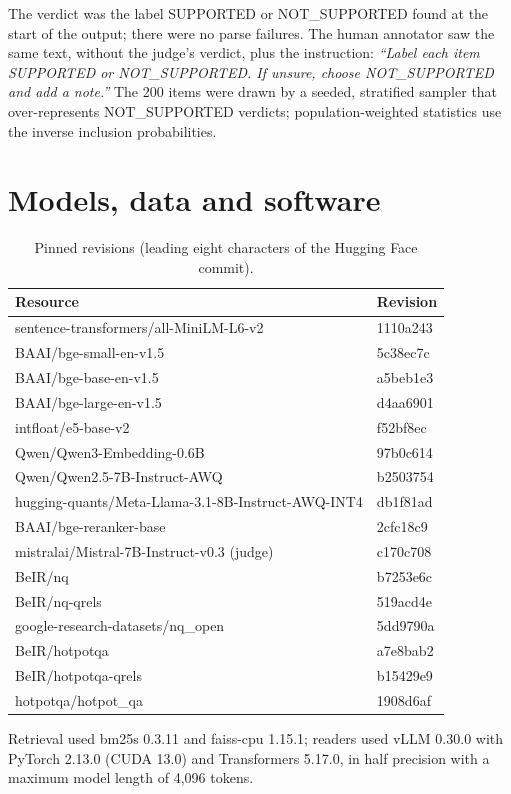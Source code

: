The verdict was the label SUPPORTED or NOT\_SUPPORTED found at the start of the output; there were no parse failures. The human annotator saw the same text, without the judge's verdict, plus the instruction: \emph{``Label each item SUPPORTED or NOT\_SUPPORTED. If unsure, choose NOT\_SUPPORTED and add a note.''} The 200 items were drawn by a seeded, stratified sampler that over-represents NOT\_SUPPORTED verdicts; population-weighted statistics use the inverse inclusion probabilities.

\section{Models, data and software}\label{app:repro}
\begin{table}[h]
\centering
\small
\caption{Pinned revisions (leading eight characters of the Hugging Face commit).}
\label{tab:revisions}
\begin{tabular}{ll}
\toprule
Resource & Revision \\
\midrule
sentence-transformers/all-MiniLM-L6-v2 & 1110a243 \\
BAAI/bge-small-en-v1.5 & 5c38ec7c \\
BAAI/bge-base-en-v1.5 & a5beb1e3 \\
BAAI/bge-large-en-v1.5 & d4aa6901 \\
intfloat/e5-base-v2 & f52bf8ec \\
Qwen/Qwen3-Embedding-0.6B & 97b0c614 \\
Qwen/Qwen2.5-7B-Instruct-AWQ & b2503754 \\
hugging-quants/Meta-Llama-3.1-8B-Instruct-AWQ-INT4 & db1f81ad \\
BAAI/bge-reranker-base & 2cfc18c9 \\
mistralai/Mistral-7B-Instruct-v0.3 (judge) & c170c708 \\
BeIR/nq & b7253e6c \\
BeIR/nq-qrels & 519acd4e \\
google-research-datasets/nq\_open & 5dd9790a \\
BeIR/hotpotqa & a7e8bab2 \\
BeIR/hotpotqa-qrels & b15429e9 \\
hotpotqa/hotpot\_qa & 1908d6af \\
\bottomrule
\end{tabular}
\end{table}

Retrieval used bm25s 0.3.11 and faiss-cpu 1.15.1; readers used vLLM 0.30.0 with PyTorch 2.13.0 (CUDA 13.0) and Transformers 5.17.0, in half precision with a maximum model length of 4,096 tokens.


